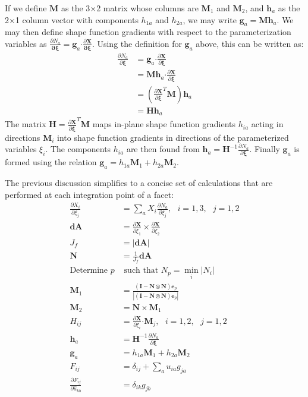 If we define ${\bm {M}}$ as the 3$\times$2 matrix whose columns are ${\bm {M}}_1$ and ${\bm M}_2$, and $\bm{h}_a$ as the 2$\times$1 column vector with components $h_{1a}$ and $h_{2a}$, we may write ${\bm g}_a = {\bm M}{\bm h}_a$. We may then define shape function gradients with respect to the parameterization variables as $\frac{\partial N_a}{\bm{\partial {\xi}}} = {\bm g}_a \bm{\cdot} \frac{\partial {\bm X}}{\bm{\partial {\xi}}}$. Using the definition for ${\bm g}_a$ above, this can be written as:
\begin{align}
\frac{\partial N_a}{\partial {\bm \xi}} &= {\bm g}_a \bm{\cdot} \frac{\partial {\bm X}}{\partial {\bm \xi}} \\
&= {\bm M}{\bm h}_a \bm{\cdot} \frac{\partial {\bm X}}{\partial {\bm \xi}} \\
&= (\frac{\partial {\bm X}}{\partial {\bm \xi}}^T{\bm M}){\bm h}_a \\
&= {\bm H}{\bm h}_a
\end{align}
The matrix ${\bm H} = \frac{\partial {\bm X}}{\partial {\bm \xi}}^T{\bm M}$ maps in-plane shape function gradients $h_{ia}$ acting in directions ${\bm M}_i$ into shape function gradients in directions of the parameterized variables ${\xi_i}$. The components $h_{ia}$ are then found from ${\bm h}_a = {\bm H}^{-1}\frac{\partial N_a}{\partial {\bm \xi}}$. Finally ${\bm g}_a$ is formed using the relation ${\bm g}_a = {h_{1a}}{\bm M}_1 + {h_{2a}}{\bm M}_2$.

The previous discussion simplifies to a concise set of calculations that are performed at each integration point of a facet:
\begin{align}
\frac{\partial X_{i}}{\partial \xi_j} &= \sum_a X_{i}\frac{\partial N_a}{\partial \xi_j}, \text{\ \ \ \ }i=1,3, \text{\ \ }j = 1,2 \\
{\bm{dA}} &= \frac{\partial{\bm{X}}}{\partial \xi_1} \times \frac{\partial {\bm {X}}}{\partial \xi_2} \\
J_f &= | {\bm {dA}}| \\
{\bm N} &= \frac{1}{J_f}{\bm {dA}} \\
\text{Determine } p &\text{ such that } N_p = \min_i{|N_i|} \\
{\bm M}_1 &=\frac{ ({\bm I} - {\bm N}\otimes{\bm N}){\bm e}_p}{|({\bm I} - {\bm N}\otimes{\bm N}){\bm e}_p|} \\
{\bm M}_2 &= {\bm N} \times {\bm M}_1 \\
H_{ij} &= \frac{\partial {\bm X}}{\partial \xi_i} \bm{\cdot} {\bm M}_j, \text{\ \ \ \ }i=1,\text{2}, \text{\ \ }j = 1,\text{2} \\
{\bm h}_a &= {\bm H}^{-1} \frac{\partial N_a}{\partial {\bm \xi}} \\
{\bm g}_a &= h_{1a}{\bm M}_1 + h_{2a}{\bm M}_2 \\
F_{ij} &= \delta_{ij} + \sum_a{u_{ia}g_{ja}} \\
\frac{\partial F_{ij}}{\partial \hat{u}_{kb}} &= \delta_{ik}g_{jb}
\end{align}

